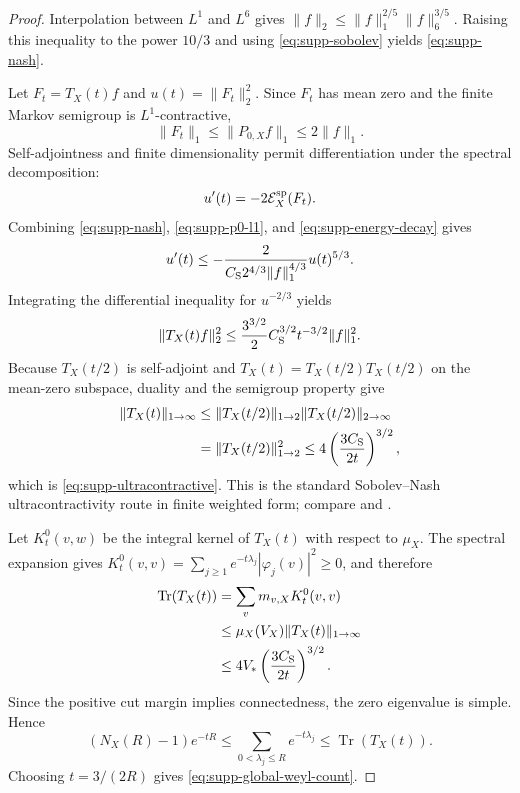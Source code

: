 \documentclass[11pt]{article}
\theoremstyle{definition}
\theoremstyle{remark}
\newcommand{\Tr}{\operatorname{Tr}}
\begin{document}
\begin{proof}
Interpolation between $L^1$ and $L^6$ gives
$\|f\|_2\le\|f\|_1^{2/5}\|f\|_6^{3/5}$.  Raising this inequality to the
power $10/3$ and using \eqref{eq:supp-sobolev} yields
\eqref{eq:supp-nash}.

Let $F_t=T_X(t)f$ and $u(t)=\|F_t\|_2^2$.  Since $F_t$ has mean zero and the
finite Markov semigroup is $L^1$-contractive,
\begin{equation}
 \|F_t\|_1
 \le\|P_{0,X}f\|_1
 \le2\|f\|_1.
 \label{eq:supp-p0-l1}
\end{equation}
Self-adjointness and finite dimensionality permit differentiation under the
spectral decomposition:
\begin{equation}
 u'(t)=-2\mathcal E_X^{\rm sp}(F_t).
 \label{eq:supp-energy-decay}
\end{equation}
Combining \eqref{eq:supp-nash}, \eqref{eq:supp-p0-l1}, and
\eqref{eq:supp-energy-decay} gives
\begin{equation}
 u'(t)
 \le-\frac{2}{C_{\rm S}2^{4/3}\|f\|_1^{4/3}}u(t)^{5/3}.
 \label{eq:supp-nash-ode}
\end{equation}
Integrating the differential inequality for $u^{-2/3}$ yields
\begin{equation}
 \|T_X(t)f\|_2^2
 \le \frac{3^{3/2}}{2}C_{\rm S}^{3/2}t^{-3/2}\|f\|_1^2.
 \label{eq:supp-l1-l2}
\end{equation}
Because $T_X(t/2)$ is self-adjoint and
$T_X(t)=T_X(t/2)T_X(t/2)$ on the mean-zero subspace, duality and the semigroup
property give
\begin{align}
 \|T_X(t)\|_{1\to\infty}
 &\le\|T_X(t/2)\|_{1\to2}\|T_X(t/2)\|_{2\to\infty} \\
 &=\|T_X(t/2)\|_{1\to2}^2
 \le4\left(\frac{3C_{\rm S}}{2t}\right)^{3/2},
\end{align}
which is \eqref{eq:supp-ultracontractive}.  This is the standard
Sobolev--Nash ultracontractivity route in finite weighted form; compare
\cite[Chs.~10--11]{Chung1997} and \cite{SaloffCoste2002}.

Let $K_t^0(v,w)$ be the integral kernel of $T_X(t)$ with respect to $\mu_X$.
The spectral expansion gives
$K_t^0(v,v)=\sum_{j\ge1}e^{-t\lambda_j}|\varphi_j(v)|^2\ge0$, and therefore
\begin{align}
 \Tr(T_X(t))
 &=\sum_v m_{v,X}K_t^0(v,v) \\
 &\le \mu_X(V_X)\|T_X(t)\|_{1\to\infty} \\
 &\le4V_*\left(\frac{3C_{\rm S}}{2t}\right)^{3/2}.
 \label{eq:supp-heat-trace}
\end{align}
Since the positive cut margin implies connectedness, the zero eigenvalue is
simple.  Hence
\begin{equation}
 (N_X(R)-1)e^{-tR}
 \le\sum_{0<\lambda_j\le R}e^{-t\lambda_j}
 \le\Tr(T_X(t)).
 \label{eq:supp-counting-trace}
\end{equation}
Choosing $t=3/(2R)$ gives \eqref{eq:supp-global-weyl-count}.
\end{proof}
\end{document}
